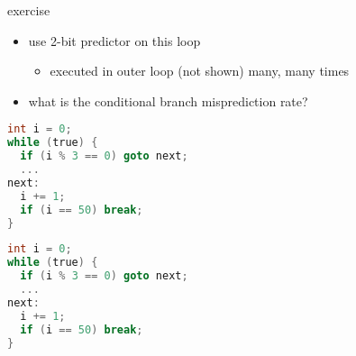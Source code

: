 \begin{frame}[fragile,label=2BmispredEx]{exercise}
\begin{itemize}
\item use 2-bit predictor on this loop
    \begin{itemize}
    \item executed in outer loop (not shown) many, many times
    \end{itemize}
\item what is the conditional branch misprediction rate?
\end{itemize}
\begin{lstlisting}[language=C,style=small]
int i = 0;
while (true) {
  if (i % 3 == 0) goto next;
  ...
next:
  i += 1;
  if (i == 50) break;
}
\end{lstlisting}
\end{frame}

\ifdefined\exCode\else\newsavebox\exCode\fi
\begin{lrbox}{\exCode}
\begin{lstlisting}[language=C,style=smaller]
int i = 0;
while (true) {
  if (i % 3 == 0) goto next;
  ...
next:
  i += 1;
  if (i == 50) break;
}
\end{lstlisting}
\end{lrbox}

